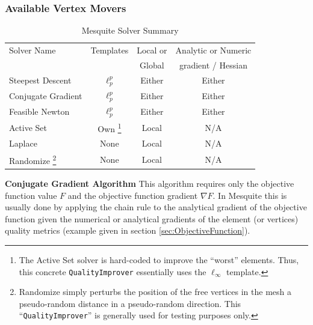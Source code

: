 \subsubsection{Available Vertex Movers}

\begin{table}[h]
\begin{center}
\begin{minipage}[h]{\textwidth}
\renewcommand{\thempfootnote}{\arabic{mpfootnote}}
\begin{tabular}{|l|c|c|c|}
\hline
Solver Name        & Templates          & Local or & Analytic or Numeric   \\
                   &                    & Global   & gradient / Hessian   \\ 
\hline 
Steepest Descent   & $\ell_p^p$         & Either   & Either               \\
Conjugate Gradient & $\ell_p^p$         & Either   & Either               \\
Feasible Newton    & $\ell_p^p$         & Either   & Either               \\
Active Set         & Own \footnote{The Active Set solver is hard-coded to improve the ``worst''
elements.  Thus, this concrete {\tt QualityImprover} essentially uses the $\ell_\infty$ template.}
                                        & Local    & N/A                  \\
Laplace            & None               & Local    & N/A                  \\
Randomize \footnote{Randomize simply perturbs the position of the free vertices in the mesh
a pseudo-random distance in a pseudo-random direction.  This
``{\tt QualityImprover}'' is generally used for testing purposes only.}
                   & None               & Local    & N/A                  \\
\hline
\end{tabular}
\caption{\label{Solvers} Mesquite Solver Summary}
\end{minipage}
\end{center}
\end{table}

{\bf Conjugate Gradient Algorithm } \newline
\label{append_conjgrad}
This algorithm requires only
the objective function value $F$ and the objective function gradient $\nabla F$. 
In Mesquite this is usually done by applying the chain rule to the
analytical gradient of the objective function given the numerical or
analytical gradients of the element (or vertices) quality metrics 
(example given in section \ref{sec:ObjectiveFunction}). 

